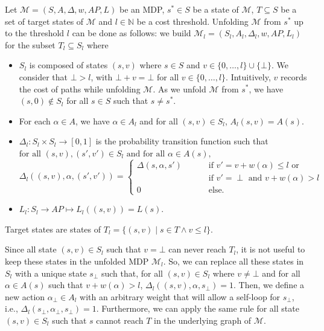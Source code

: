 \begin{definition}\label{unfolding-def} Let
  $\mathcal{M} = (S, A, \Delta, w, AP, L)$ be an MDP, $s^* \in S$ be a state of
  $\mathcal{M}$, $T \subseteq S$ be a set of target states of $\mathcal{M}$ and $l \in \mathbb{N}$ be a cost threshold.
  Unfolding $\mathcal{M}$ from $s^*$ up to the threshold $l$ can be done as follows:
  we build $\mathcal{M}_l = (S_l, A_l, \Delta_l, w, AP, L_l)$ for the subset $T_l \subseteq S_l$ where
  \begin{itemize}
  \item $S_l$ is composed of states $(s, v)$ where $s \in S$ and $v \in \{0, \dots, l\} \cup \{\bot\}$.
  We consider that $\bot > l$, with $\bot + v = \bot$ for all $v \in \{0, \dots, l\}$.
  Intuitively, $v$ records the cost of paths while unfolding $\mathcal{M}$.
  As we unfold $\mathcal{M}$ from $s^*$, we have
  $(s, 0) \not \in S_l$ for all $s \in S$ such that $s \neq s^*$.
  \item For each $\alpha \in A$, we have $\alpha \in A_l$ and for all $(s, v) \in S_l$, $A_l(s, v) = A(s)$.
  \item $\Delta_l: S_l \times S_l \rightarrow [0, 1]$ is the probability transition function such that
  $\text{for all } (s, v), (s', v') \in S_l \text{ and for all } \alpha \in A(s),$
  \[
  \Delta_l((s, v), \alpha, (s', v')) =
  \begin{cases}
  	\Delta(s, \alpha, s') & \quad \quad \text{ if } v' = v + w(\alpha) \leq l \text{ or}\\
  	 & \quad \quad \text{ if } v' = \perp \text{ and } v+w(\alpha) > l \\
  	0 & \quad \quad \text{ else}.
  \end{cases}
  \]
  \item $L_l:S_l \rightarrow AP \mapsto L_l((s, v)) = L(s)$.
  \end{itemize}
  Target states are states of
  $T_l = \{(s, v) \;|\; s \in T \wedge v \leq l \}$.
\end{definition}
\begin{remark}
  Since all state $(s, v) \in S_l$ such that $v = \bot$ can never reach $T_l$, it is not useful to keep these states in the unfolded MDP $\mathcal{M}_l$. So, we can replace all these states in $S_l$ with a unique state $s_\bot$ such that, for all $(s, v) \in S_l$ where $v \neq \bot$ and for all $\alpha \in A(s)$ such that $v + w(\alpha) > l$,
  $\Delta_l((s, v), \alpha, s_\bot) = 1$. Then, we define a new action $\alpha_\bot \in A_l$ with an arbitrary weight that will allow a self-loop for $s_\bot$, i.e., $\Delta_l(s_\bot, \alpha_\bot, s_\bot)=1$.
  Furthermore, we can apply the same rule for all state $(s, v) \in S_l$ such that $s$ cannot reach $T$ in the underlying graph of $\mathcal{M}$.
\end{remark}

